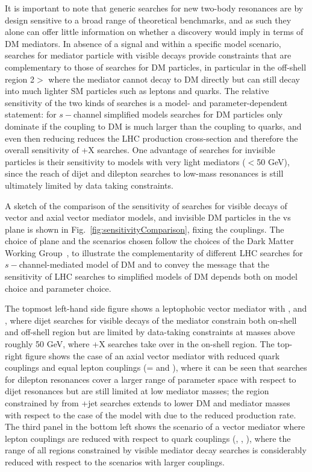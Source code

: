 It is important to note that generic searches for new two-body resonances
are by design sensitive to a broad range of theoretical benchmarks, 
and as such they alone can offer little information on 
whether a discovery would imply in terms of DM mediators.
In absence of a signal and within a specific model scenario,
searches for mediator particle with visible decays
provide constraints that are complementary to those of searches
for DM particles, in particular in the off-shell region 2\mdm $>$ \mmed where the mediator
cannot decay to DM directly but can still decay into much lighter SM particles
such as leptons and quarks. 
The relative sensitivity of the two kinds of searches
is a model- and parameter-dependent statement: for $s-$channel simplified models
searches for DM particles only dominate if the coupling to DM is much larger
than the coupling to quarks, and even then reducing \gq reduces the LHC production
cross-section and therefore the overall sensitivity of \MET+X searches. 
One advantage of searches for invisible particles is their sensitivity to models with
very light mediators ($<$50 GeV), since the reach of dijet and dilepton searches to low-mass
resonances is still ultimately limited by data taking constraints. 

A sketch of the comparison of the sensitivity of searches for visible decays of vector and axial vector mediator models, and invisible DM particles 
in the \mdm vs \mmed plane is shown in Fig.~\ref{fig:sensitivityComparison}, fixing the couplings. The choice of plane and the scenarios chosen follow the choices of the Dark Matter Working Group~\cite{Albert:2017onk}, to illustrate the complementarity of different LHC searches for $s-$channel-mediated model of DM and to convey the message that the sensitivity of LHC searches to simplified models of DM depends both on model choice and parameter choice. 

The topmost left-hand side figure shows a leptophobic vector mediator with ,  and , where dijet searches for visible decays of the mediator constrain both on-shell and off-shell region but are limited by data-taking constraints at masses above roughly 50 GeV, where \MET+X searches take over in the on-shell region. The top-right figure shows the case of an axial vector mediator with reduced quark couplings and equal lepton couplings (\gq= and ), where it can be seen that searches for dilepton resonances cover a larger range of parameter space with respect to dijet resonances but are still limited at low mediator masses; the region constrained by from \MET+jet searches extends to lower DM and mediator masses with respect to the case of the model with  due to the reduced production rate. The third panel in the bottom left shows the scenario of a vector mediator where lepton couplings are reduced with respect to quark couplings (, , ), where the range of all regions constrained by visible mediator decay searches is considerably reduced with respect to the scenarios with larger couplings. 

